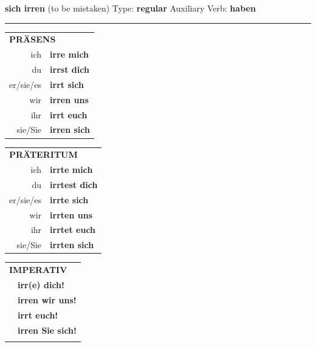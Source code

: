 \documentclass[10pt,a4paper]{revtex4-2}
\begin{document}
\begin{verbbox}
    {\Large \bf sich irren} (to be mistaken) \hfill Type: \textbf{regular} \hfill Auxiliary Verb: \textbf{haben} 
    
     \vspace{5pt}

    \hrule
    
    \vspace{5pt}

  \begin{tabular}{rl}
     \multicolumn{2}{l}{\textbf{PRÄSENS} }\\
    ich & \textbf{irre mich}\\
    du & \textbf{irrst dich}\\
    er/sie/es & \textbf{irrt sich}\\
    wir & \textbf{irren uns}\\
    ihr & \textbf{irrt euch}\\
    sie/Sie & \textbf{irren sich}\\
  \end{tabular}
  \hfill
     \begin{tabular}{rl}
    \multicolumn{2}{l}{\textbf{PRÄTERITUM} }\\
    ich & \textbf{irrte mich}\\
    du & \textbf{irrtest dich}\\
    er/sie/es & \textbf{irrte sich}\\
    wir & \textbf{irrten uns}\\
    ihr & \textbf{irrtet euch}\\
    sie/Sie & \textbf{irrten sich}\\
  \end{tabular}
  \hfill
  \begin{tabular}{rl}
     \multicolumn{2}{l}{\textbf{IMPERATIV} }\\
   & \textbf{irr(e) dich!}\\
   & \textbf{irren wir uns!}\\
   & \textbf{irrt euch!}\\
   & \textbf{irren Sie sich!}\\
   & \vspace{10pt}
  \end{tabular}

    \vspace{10pt}


\end{verbbox}
\end{document}
